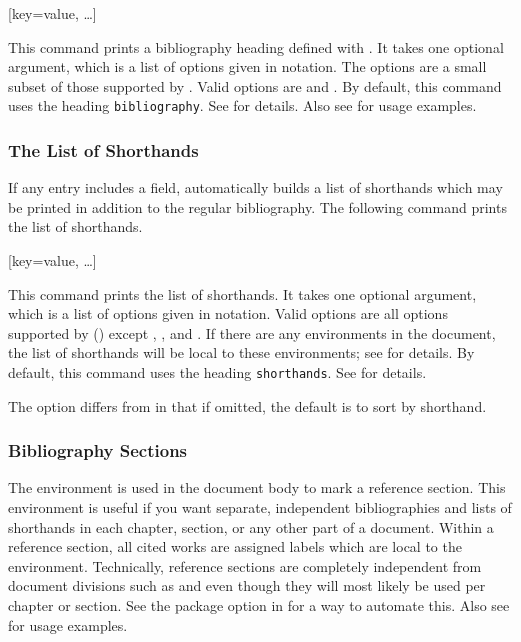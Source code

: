 \documentclass{ltxdockit}[2011/03/25]
\begin{document}
\begin{ltxsyntax}
[key=value, \dots]

This command prints a bibliography heading defined with . It takes one optional argument, which is a list of options given in \keyval notation. The options are a small subset of those supported by . Valid options are  and . By default, this command uses the heading \texttt{bibliography}. See  for details. Also see  for usage examples.

\end{ltxsyntax}

\subsubsection{The List of Shorthands}
\label{use:bib:los}

If any entry includes a  field,  automatically builds a list of shorthands which may be printed in addition to the regular bibliography. The following command prints the list of shorthands.

\begin{ltxsyntax}

[key=value, \dots]

This command prints the list of shorthands. It takes one optional argument, which is a list of options given in \keyval notation. Valid options are all options supported by  () except , , and . If there are any  environments in the document, the list of shorthands will be local to these environments; see  for details. By default, this command uses the heading \texttt{shorthands}. See  for details.

The  option differs from  in that if omitted, the default is to sort by shorthand.

\end{ltxsyntax}

\subsubsection{Bibliography Sections}
\label{use:bib:sec}

The  environment is used in the document body to mark a reference section. This environment is useful if you want separate, independent bibliographies and lists of shorthands in each chapter, section, or any other part of a document. Within a reference section, all cited works are assigned labels which are local to the environment. Technically, reference sections are completely independent from document divisions such as  and  even though they will most likely be used per chapter or section. See the  package option in  for a way to automate this. Also see  for usage examples.
\end{document}
